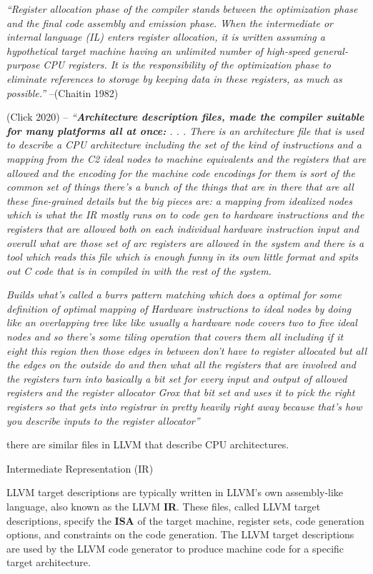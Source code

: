 \emph{``Register allocation phase of the compiler stands between the
optimization phase and the final code assembly and emission phase. When
the intermediate or internal language (IL) enters register allocation,
it is written assuming a hypothetical target machine having an unlimited
number of high-speed general-purpose CPU registers. It is the
responsibility of the optimization phase to eliminate references to
storage by keeping data in these registers, as much as possible.''}
--(Chaitin 1982)

(Click 2020) -- \emph{``\textbf{Architecture description files, made the
compiler suitable for many platforms all at once:} . . . There is an
architecture file that is used to describe a CPU architecture including
the set of the kind of instructions and a mapping from the C2 ideal
nodes to machine equivalents and the registers that are allowed and the
encoding for the machine code encodings for them is sort of the common
set of things there's a bunch of the things that are in there that are
all these fine-grained details but the big pieces are: a mapping from
idealized nodes which is what the IR mostly runs on to code gen to
hardware instructions and the registers that are allowed both on each
individual hardware instruction input and overall what are those set of
arc registers are allowed in the system and there is a tool which reads
this file which is enough funny in its own little format and spits out C
code that is in compiled in with the rest of the system.}

\emph{Builds what's called a burrs pattern matching which does a optimal
for some definition of optimal mapping of Hardware instructions to ideal
nodes by doing like an overlapping tree like like usually a hardware
node covers two to five ideal nodes and so there's some tiling operation
that covers them all including if it eight this region then those edges
in between don't have to register allocated but all the edges on the
outside do and then what all the registers that are involved and the
registers turn into basically a bit set for every input and output of
allowed registers and the register allocator Grox that bit set and uses
it to pick the right registers so that gets into registrar in pretty
heavily right away because that's how you describe inputs to the
register allocator''}

there are similar files in LLVM that describe CPU architectures.

Intermediate Representation (IR)

LLVM target descriptions are typically written in LLVM's own
assembly-like language, also known as the LLVM \textbf{IR}. These files,
called LLVM target descriptions, specify the \textbf{ISA} of the target
machine, register sets, code generation options, and constraints on the
code generation. The LLVM target descriptions are used by the LLVM code
generator to produce machine code for a specific target architecture.

